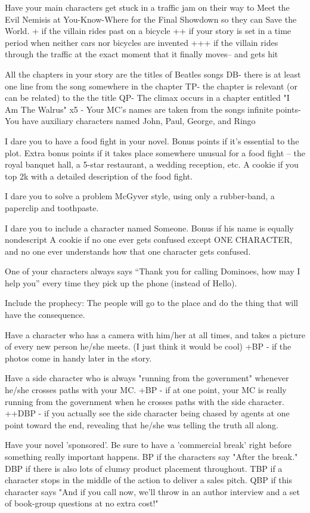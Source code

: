 \documentclass[a4paper,12pt]{article}
\begin{document}
Have your main characters get stuck in a traffic jam on their way to Meet the Evil Nemisis at You-Know-Where for the Final Showdown so they can Save the World.
+ if the villain rides past on a bicycle
++ if your story is set in a time period when neither cars nor bicycles are invented
+++ if the villain rides through the traffic at the exact moment that it finally moves-- and gets hit

All the chapters in your story are the titles of Beatles songs
DB- there is at least one line from the song somewhere in the chapter
TP- the chapter is relevant (or can be related) to the the title
QP- The climax occurs in a chapter entitled "I Am The Walrus"
x5 - Your MC's names are taken from the songs
infinite points- You have auxiliary characters named John, Paul, George, and Ringo

I dare you to have a food fight in your novel.
Bonus points if it's essential to the plot.
Extra bonus points if it takes place somewhere unusual for a food fight -- the royal banquet hall, a 5-star restaurant, a wedding reception, etc.
A cookie if you top 2k with a detailed description of the food fight.

I dare you to solve a problem McGyver style, using only a rubber-band, a paperclip and toothpaste.

I dare you to include a character named Someone.
Bonus if his name is equally nondescript
A cookie if no one ever gets confused except ONE CHARACTER, and no one ever understands how that one character gets confused.

One of your characters always says “Thank you for calling
Dominoes, how may I help you” every time they pick up the phone (instead
of Hello).

Include the prophecy: The people will go to the place and do the thing that will have the consequence.

Have a character who has a camera with him/her at all times, and takes a picture of every new person he/she meets. (I just think it would be cool)
+BP - if the photos come in handy later in the story.


Have a side character who is always "running from the government" whenever he/she crosses paths with your MC.
+BP - if at one point, your MC is really running from the government when he crosses paths with the side character.
++DBP - if you actually see the side character being chased by agents at one point toward the end, revealing that he/she was telling the truth all along.

Have your novel 'sponsored'. Be sure to have a 'commercial break' right before something really important happens.
BP if the characters say "After the break."
DBP if there is also lots of clumsy product placement throughout.
TBP if a character stops in the middle of the action to deliver a sales pitch.
QBP if this character says "And if you call now, we'll throw in an author interview and a set of book-group questions at no extra cost!"
\end{document}
